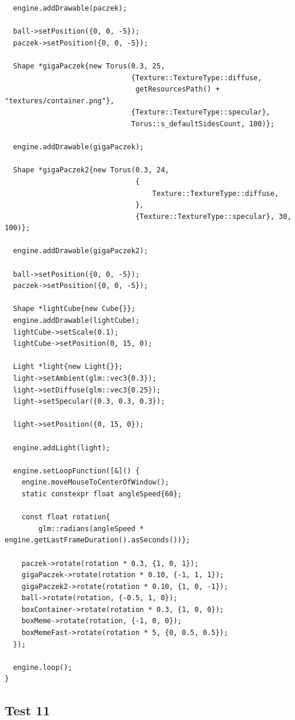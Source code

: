 \documentclass[11pt]{article}
\begin{document}
\begin{verbatim}
  engine.addDrawable(paczek);

  ball->setPosition({0, 0, -5});
  paczek->setPosition({0, 0, -5});

  Shape *gigaPaczek{new Torus(0.3, 25,
                              {Texture::TextureType::diffuse,
                               getResourcesPath() + "textures/container.png"},
                              {Texture::TextureType::specular},
                              Torus::s_defaultSidesCount, 100)};

  engine.addDrawable(gigaPaczek);

  Shape *gigaPaczek2{new Torus(0.3, 24,
                               {
                                   Texture::TextureType::diffuse,
                               },
                               {Texture::TextureType::specular}, 30, 100)};

  engine.addDrawable(gigaPaczek2);

  ball->setPosition({0, 0, -5});
  paczek->setPosition({0, 0, -5});

  Shape *lightCube{new Cube{}};
  engine.addDrawable(lightCube);
  lightCube->setScale(0.1);
  lightCube->setPosition(0, 15, 0);

  Light *light{new Light{}};
  light->setAmbient(glm::vec3{0.3});
  light->setDiffuse(glm::vec3{0.25});
  light->setSpecular({0.3, 0.3, 0.3});

  light->setPosition({0, 15, 0});

  engine.addLight(light);

  engine.setLoopFunction([&]() {
    engine.moveMouseToCenterOfWindow();
    static constexpr float angleSpeed{60};

    const float rotation{
        glm::radians(angleSpeed * engine.getLastFrameDuration().asSeconds())};

    paczek->rotate(rotation * 0.3, {1, 0, 1});
    gigaPaczek->rotate(rotation * 0.10, {-1, 1, 1});
    gigaPaczek2->rotate(rotation * 0.10, {1, 0, -1});
    ball->rotate(rotation, {-0.5, 1, 0});
    boxContainer->rotate(rotation * 0.3, {1, 0, 0});
    boxMeme->rotate(rotation, {-1, 0, 0});
    boxMemeFast->rotate(rotation * 5, {0, 0.5, 0.5});
  });

  engine.loop();
}
\end{verbatim}
\subsection{Test 11}
\label{sec:org98e250e}
\end{document}
